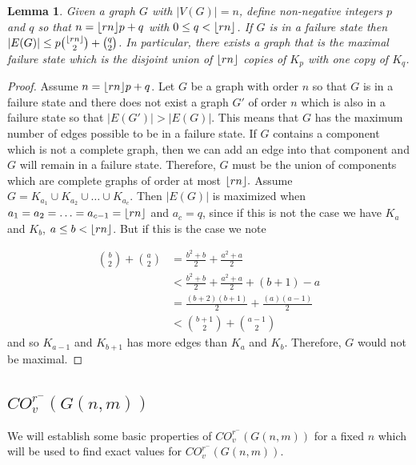 \documentclass[12pt]{article}
\DeclarePairedDelimiter{\floor}{\lfloor}{\rfloor}
\newtheorem{lemma}[theorem]{Lemma}
\theoremstyle{definition}
\newcommand{\COVMIN}[1]{CO^{r^-}_{v}(#1)}
\begin{document}
\begin{lemma}\label{maxedgefailurestate}
Given a graph $G$ with $|V(G)|=n$, define non-negative integers $p$ and $q$ so that $n=\floor{rn}p+q$ with $0 \leq q < \floor{rn}$. If $G$ is in a failure state then $|E(G)|\leq p{\floor{rn} \choose 2}+{q \choose 2}$. In particular, there exists a graph that is the maximal failure state which is the disjoint union of $\floor{rn}$ copies of $K_p$ with one copy of $K_q$. 
\end{lemma}
\begin{proof}
Assume $n=\floor{rn}p+q$.
Let $G$ be a graph with order $n$ so that $G$ is in a failure state and there does not exist a graph $G'$ of order $n$ which is also in a failure state so that $|E(G')| > |E(G)|$. This means that $G$ has the maximum number of edges possible to be in a failure state. If $G$ contains a component which is not a complete graph, then we can add an edge into that component and $G$ will remain in a failure state. Therefore, $G$ must be the union of components which are complete graphs of order at most $\floor{rn}.$ Assume $G = K_{a_1} \cup K_{a_2} \cup \ldots \cup K_{a_c}$. Then $|E(G)|$ is maximized when $a_1=a_2=\ldots = a_{c-1} = \floor{rn}$ and $a_c=q$, since if this is not the case we have $K_{a}$ and $K_{b}$, $a\leq b < \floor{rn}$. But if this is the case we note

\begin{align*}
  {b \choose 2} + {a \choose 2} &= \frac{b^{2}+b}{2}+\frac{a^{2}+a}{2}\\
  &< \frac{b^{2}+b}{2}+\frac{a^{2}+a}{2} + (b+1) - a\\
  &= \frac{(b+2)(b+1)}{2}+\frac{(a)(a-1)}{2}\\
  &< {b+1 \choose 2}+{a-1 \choose 2}
\end{align*}
and so $K_{a-1}$ and $K_{b+1}$ has more edges than $K_a$ and $K_b$. Therefore, $G$ would not be maximal.
\end{proof}



\subsection{$\COVMIN{G(n,m)}$}

We will establish some basic properties of $\COVMIN{G(n,m)}$ for a fixed $n$ which will be used to find exact values for $\COVMIN{G(n,m)}.$ 
 
\end{document}
